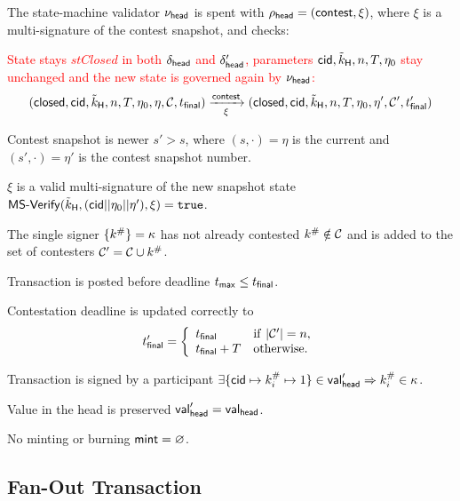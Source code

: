 \begin{samepage}
	\noindent The state-machine validator $\nu_\mathsf{head}$ is spent with
	$\rho_{\mathsf{head}} = (\mathsf{contest}, \xi)$, where $\xi$ is a multi-signature of
	the contest snapshot, and checks:
	\begin{menumerate}
		\item \textcolor{red}{State stays $stClosed$ in both $\delta_{\mathsf{head}}$ and
			$\delta_{\mathsf{head}}'$, parameters $\mathsf{cid},\tilde{k}_{\mathsf{H}},n,T, \eta_{0}$
			stay unchanged and the new state is governed again by $\nu_\mathsf{head}$:}
		\[
			(\mathsf{closed},\mathsf{cid},\tilde{k}_{\mathsf{H}},n,T,\eta_0,\eta,\mathcal{C},t_{\mathsf{final}}) \xrightarrow[\xi]{\mathsf{contest}} (\mathsf{closed},\mathsf{cid},\tilde{k}_{\mathsf{H}},n,T,\eta_0,\eta',\mathcal{C}',t_{\mathsf{final}}')
		\]
		\item Contest snapshot is newer $s' > s$, where $(s, \cdot) = \eta$ is the
		current and $(s', \cdot) = \eta'$ is the contest snapshot number.
		\item $\xi$ is a valid multi-signature of the new snapshot state
		$\mathsf{MS\textsf{-}{}Verify}(\tilde{k}_{\mathsf{H}},(\mathsf{cid} || \eta_{0} || \eta'),\xi) = \mathtt{true}$.
		\item The single signer $\{k^{\#}\} = \kappa$ has not already contested
		$k^{\#} \notin \mathcal{C}$ and is added to the set of contesters
		$\mathcal{C}' = \mathcal{C} \cup k^{\#}$.
		\item Transaction is posted before deadline $t_{\mathsf{max}} \leq t_{\mathsf{final}}$.
		\item Contestation deadline is updated correctly to
		\[
			t_{\mathsf{final}}' = \left\{\begin{array}{ll}
				t_{\mathsf{final}}     & \mathrm{if} ~ |\mathcal{C}'| = n, \\
				t_{\mathsf{final}} + T & \mathrm{otherwise.}
			\end{array}\right.
		\]
		\item Transaction is signed by a participant
		$\exists \{\mathsf{cid} \mapsto k^{\#}_{i} \mapsto 1\} \in \mathsf{val}_{\mathsf{head}}' \Rightarrow k^{\#}_{i} \in \kappa$.
		\item Value in the head is preserved $\mathsf{val}_{\mathsf{head}}' = \mathsf{val}_{\mathsf{head}}$.
		\item No minting or burning $\mathsf{mint} = \varnothing$.
	\end{menumerate}
\end{samepage}

\subsection{Fan-Out Transaction}

